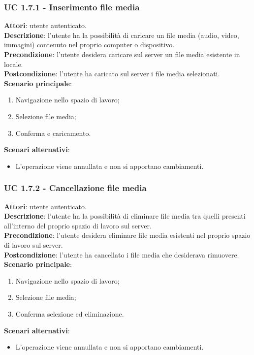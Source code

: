 \subsubsection{UC 1.7.1 - Inserimento file media}{
	\label{uc1.7.1}
	\textbf{Attori}: utente autenticato. \\
	\textbf{Descrizione}: l'utente ha la possibilità di caricare un file media (audio, video, immagini) contenuto nel proprio computer o dispositivo. \\
	\textbf{Precondizione}: l'utente desidera caricare sul server un file media esistente in locale.	\\
	\textbf{Postcondizione}: l'utente ha caricato sul server i file media selezionati.	\\
	\textbf{Scenario principale}:
	\begin{enumerate}
		\item Navigazione nello spazio di lavoro;
		\item Selezione file media;
		\item Conferma e caricamento.
	\end{enumerate}
	\textbf{Scenari alternativi}: 
	\begin{itemize}
		\item L'operazione viene annullata e non si apportano cambiamenti.
	\end{itemize}
	}
	\subsubsection{UC 1.7.2 - Cancellazione file media}{
		\label{uc1.7.2}
		\textbf{Attori}: utente autenticato.	\\
		\textbf{Descrizione}: l'utente ha la possibilità di eliminare file media tra quelli presenti all'interno del proprio spazio di lavoro sul server. \\
		\textbf{Precondizione}: l'utente desidera eliminare file media esistenti nel proprio spazio di lavoro sul server.	\\
		\textbf{Postcondizione}: l'utente ha cancellato i file media che desiderava rimuovere.	\\
		\textbf{Scenario principale}:
		\begin{enumerate}
			\item Navigazione nello spazio di lavoro;
			\item Selezione file media;
			\item Conferma selezione ed eliminazione.
		\end{enumerate}
		\textbf{Scenari alternativi}: 
		\begin{itemize}
			\item L'operazione viene annullata e non si apportano cambiamenti.
		\end{itemize}
		}
